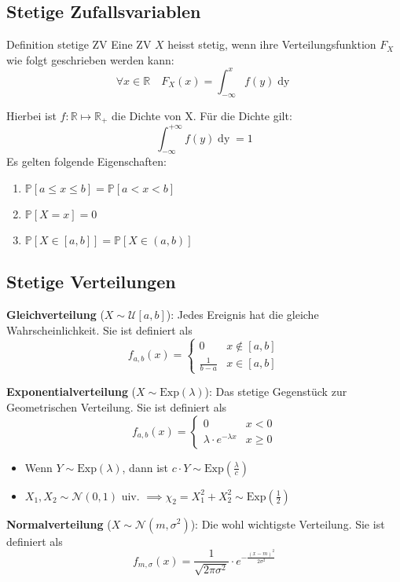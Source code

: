 \documentclass[a4paper,10pt]{article}
\def\R{\mathbb{R}}
\def\P{\mathbb{P}}
\begin{document}
\subsection{Stetige Zufallsvariablen}
\begin{subbox}{Definition stetige ZV}
	Eine ZV \(X\) heisst stetig, wenn ihre Verteilungsfunktion \(F_X\) wie folgt geschrieben werden kann:
	\[\forall x \in \R \quad F_X(x) = \int_{-\infty}^x f(y) \mathop{dy}\]
\end{subbox}
Hierbei ist \(f: \R \mapsto \R_+\) die Dichte von X. Für die Dichte gilt:
\[\int_{-\infty}^{+\infty}f(y) \mathop{dy} = 1\]
Es gelten folgende Eigenschaften:
\begin{enumerate}
	\item \(\P[a \le x \le b] = \P[a < x < b]\)
	\item \(\P[X=x] = 0\)
	\item \(\P[X \in [a,b]] = \P[X \in (a,b)]\)
\end{enumerate}

\subsection{Stetige Verteilungen}
\textbf{Gleichverteilung} (\(X \sim \mathcal{U}[a,b]\)): Jedes Ereignis hat die gleiche Wahrscheinlichkeit. Sie ist definiert als
\[f_{a,b}(x) = \begin{cases}
	0             & x \notin [a,b] \\
	\frac{1}{b-a} & x \in [a,b]
\end{cases}\]

\noindent \textbf{Exponentialverteilung} (\(X \sim \text{Exp}(\lambda)\)): Das stetige Gegenstück zur Geometrischen Verteilung. Sie ist definiert als
\[f_{a,b}(x) = \begin{cases}
	0                            & x < 0    \\
	\lambda \cdot e^{-\lambda x} & x \geq 0
\end{cases}\]
\begin{itemize}
	\item Wenn \(Y\sim \text{Exp}(\lambda)\), dann ist \(c \cdot Y \sim \text{Exp}(\frac{\lambda}{c})\)
	\item \(X_1, X_2 \sim \mathcal{N}(0,1)\) uiv. \(\implies \chi_2 = X_1^2 +X_2^2 \sim \text{Exp}(\frac{1}{2})\)
\end{itemize}

\noindent \textbf{Normalverteilung} (\(X \sim \mathcal{N}(m, \sigma^2)\)): Die wohl wichtigste Verteilung. Sie ist definiert als
\[f_{m, \sigma}(x) = \frac{1}{\sqrt{2 \pi \sigma^2}} \cdot e^{-\frac{(x-m)^2}{2 \sigma^2}}\]
\end{document}
